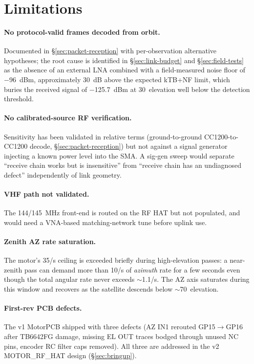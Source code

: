 \section{Limitations}

\paragraph{No protocol-valid frames decoded from orbit.}
Documented in \S\ref{sec:packet-reception} with per-observation alternative hypotheses; the root cause is identified in \S\ref{sec:link-budget} and \S\ref{sec:field-tests} as the absence of an external LNA combined with a field-measured noise floor of $-$96~dBm, approximately 30~dB above the expected kTB+NF limit, which buries the received signal of $-$125.7~dBm at 30\degree\ elevation well below the detection threshold.

\paragraph{No calibrated-source RF verification.}
Sensitivity has been validated in relative terms (ground-to-ground CC1200-to-CC1200 decode, \S\ref{sec:packet-reception}) but not against a signal generator injecting a known power level into the SMA. A sig-gen sweep would separate ``receive chain works but is insensitive'' from ``receive chain has an undiagnosed defect'' independently of link geometry.

\paragraph{VHF path not validated.}
The 144/145~MHz front-end is routed on the RF HAT but not populated, and would need a VNA-based matching-network tune before uplink use.

\paragraph{Zenith AZ rate saturation.}
The motor's 35\degree/s ceiling is exceeded briefly during high-elevation passes: a near-zenith pass can demand more than 10\degree/s of \textit{azimuth} rate for a few seconds even though the total angular rate never exceeds $\sim$1.1\degree/s. The AZ axis saturates during this window and recovers as the satellite descends below $\sim$70\degree\ elevation.

\paragraph{First-rev PCB defects.}
The v1 MotorPCB shipped with three defects (AZ IN1 rerouted GP15$\to$GP16 after TB6642FG damage, missing EL OUT traces bodged through unused NC pins, encoder RC filter caps removed). All three are addressed in the v2 MOTOR\_RF\_HAT design (\S\ref{sec:bringup}).


